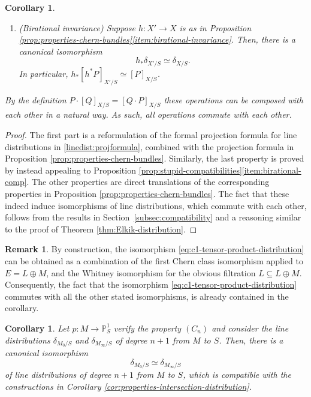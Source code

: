 \documentclass[11pt]{article}
\newcommand\hto{\mathrel{\lhook\joinrel\to}}
\theoremstyle{plain}
\newtheorem{corollary}[theorem]{Corollary}
\theoremstyle{definition}
\newtheorem{remark}[theorem]{Remark}
\newcommand{\PBbb}{\mathbb P}
\newcommand{\cfrak}{\mathfrak c}
\begin{document}
\begin{corollary}
\begin{enumerate}
\begin{displaymath}
[ \cfrak_r(E) ]_{X/S} \simeq \delta_{Y/S},
\end{displaymath}
where $i\colon Y\hto X$ is the closed immersion of $Y$ in $X$.
\item\label{item:prop-int-dist-birational} (Birational invariance) Suppose $h \colon X' \to X$ is as in Proposition \ref{prop:properties-chern-bundles}\eqref{item:birational-invariance}. Then, there is a canonical isomorphism
\begin{displaymath}
h_\ast \delta_{X'/S}\simeq \delta_{X/S}.
\end{displaymath}
In particular, $h_{\ast}[h^{\ast}P]_{X'/S}\simeq [P]_{X/S}$.
\end{enumerate}
By the definition $P \cdot [Q]_{X/S} = [Q \cdot P]_{X/S}$ these operations can be composed with each other in a natural way. As such, all operations commute with each other.

\end{corollary}

\begin{proof}
The first part is a reformulation of the formal projection formula for line distributions in \eqref{linedist:projformula}, combined with the projection formula in Proposition \ref{prop:properties-chern-bundles}. Similarly, the last property is proved by instead appealing to Proposition \ref{prop:stupid-compatibilities}\eqref{item:birational-comp}. The other properties are direct translations of the corresponding properties in Proposition \ref{prop:properties-chern-bundles}. The fact that these indeed induce isomorphisms of line distributions, which commute with each other, follows from the results in Section~\ref{subsec:compatibility} and a reasoning similar to the proof of Theorem \ref{thm:Elkik-distribution}.
\end{proof}

\begin{remark}
By construction, the isomorphism \eqref{eq:c1-tensor-product-distribution} can be obtained as a combination of the first Chern class isomorphism applied to $E=L\oplus M$, and the Whitney isomorphism for the obvious filtration $L\subseteq L\oplus M$. Consequently, the fact that the isomorphism \eqref{eq:c1-tensor-product-distribution} commutes with all the other stated isomorphisms, is already contained in the corollary.
\end{remark}

\begin{corollary}
Let $p\colon M \to \PBbb^1_S$ verify the property $(C_n)$ and consider the line distributions $\delta_{M_0/S}$ and $\delta_{M_{\infty}/S}$ of degree $n+1$ from $M$ to $S$. Then, there is a canonical isomorphism
\begin{displaymath}
\delta_{M_0/S} \simeq \delta_{M_{\infty}/S}
\end{displaymath}
of line distributions of degree $n+1$ from $M$ to $S$, which is compatible with the constructions in Corollary \ref{cor:properties-intersection-distribution}.
\end{corollary}
\end{document}
